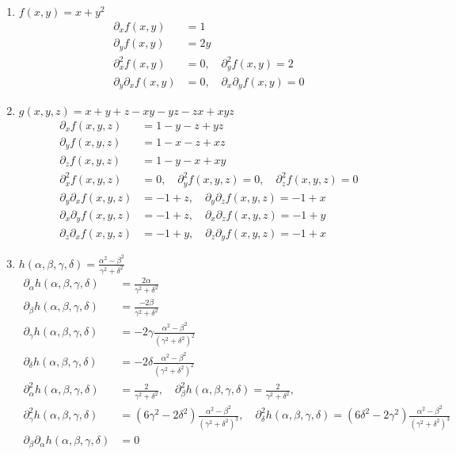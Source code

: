 \documentclass[11pt,answers]{exam}
\begin{document}
\begin{questions}
\begin{solution}
\begin{enumerate}
\item $f(x,y)=x+y^2$
\begin{align*}
\partial_xf(x,y)&=1
\\
\partial_yf(x,y)&=2y
\\
\partial_x^2f(x,y)&=0
,\quad
\partial_y^2f(x,y)=2
\\
\partial_y\partial_xf(x,y)&=0
,\quad
\partial_x\partial_yf(x,y)=0
\end{align*}
\item $g(x,y,z)=x+y+z-xy-yz-zx+xyz$
\begin{align*}
\partial_xf(x,y,z)&=1-y-z+yz
\\
\partial_yf(x,y,z)&=1-x-z+xz
\\
\partial_zf(x,y,z)&=1-y-x+xy
\\
\partial_x^2f(x,y,z)&=0, \quad \partial_y^2f(x,y,z)=0,\quad \partial_z^2f(x,y,z)=0
\\
\partial_y\partial_xf(x,y,z)&=-1+z
,\quad
\partial_y\partial_zf(x,y,z)=-1+x
\\
\partial_x\partial_yf(x,y,z)&=-1+z
,\quad
\partial_x\partial_zf(x,y,z)=-1+y
\\
\partial_z\partial_xf(x,y,z)&=-1+y
,\quad
\partial_z\partial_yf(x,y,z)=-1+x
\end{align*}
\item $h(\alpha,\beta,\gamma,\delta)=\frac{\alpha^2-\beta^2}{\gamma^2+\delta^2}$
\begin{align*}
	\partial_\alpha h(\alpha,\beta,\gamma,\delta)&=\frac{2\alpha}{\gamma^2+\delta^2}
	\\
	\partial_\beta h(\alpha,\beta,\gamma,\delta)&=\frac{-2\beta}{\gamma^2+\delta^2}
	\\
	\partial_\gamma h(\alpha,\beta,\gamma,\delta)&=-2\gamma\frac{\alpha^2-\beta^2}{(\gamma^2+\delta^2)^2}
	\\
	\partial_\delta h(\alpha,\beta,\gamma,\delta)&=-2\delta\frac{\alpha^2-\beta^2}{(\gamma^2+\delta^2)^2}
	\\
	\partial_\alpha^2h(\alpha,\beta,\gamma,\delta)&=\frac{2}{\gamma^2+\delta^2}, \quad \partial_\beta^2h(\alpha,\beta,\gamma,\delta)=\frac{2}{\gamma^2+\delta^2},\\ \partial_\gamma^2h(\alpha,\beta,\gamma,\delta)&=(6\gamma^2-2\delta^2)\frac{\alpha^2-\beta^2}{(\gamma^2+\delta^2)^3}, \quad \partial_\delta^2h(\alpha,\beta,\gamma,\delta)=(6\delta^2-2\gamma^2)\frac{\alpha^2-\beta^2}{(\gamma^2+\delta^2)^3}
	\\
	\partial_\beta\partial_\alpha h(\alpha,\beta,\gamma,\delta)&=0

\end{align*}
\end{enumerate}
\end{solution}
\end{questions}
\end{document}
